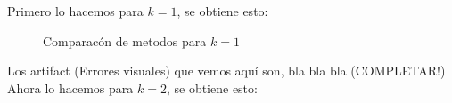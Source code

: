 Primero lo hacemos para $k=1$, se obtiene esto:

\begin{figure}[H]
    \centering
    \qquad
    \qquad
    \caption{Comparacón de metodos para $k = 1$}%
    \label{fig:example}%
\end{figure}

Los artifact (Errores visuales) que vemos aquí son, bla bla bla (COMPLETAR!)
\\
Ahora lo hacemos para $k=2$, se obtiene esto:


